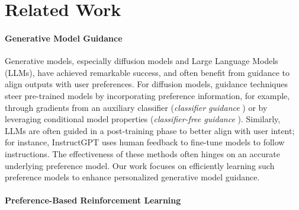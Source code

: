 \documentclass{article}
\begin{document}
\vspace{-0.2cm}\section{Related Work}
\vspace{-0.1cm}  \paragraph{Generative Model Guidance}
Generative models, especially diffusion models \cite{DBLP:journals/corr/abs-2006-11239, pmlr-v37-sohl-dickstein15, DBLP:journals/corr/abs-2105-05233} and Large Language Models (LLMs), have achieved remarkable success, and often benefit from guidance to align outputs with user preferences. For diffusion models, guidance techniques steer pre-trained models by incorporating preference information, for example, through gradients from an auxiliary classifier (\textit{classifier guidance} \cite{DBLP:journals/corr/abs-2105-05233, DBLP:journals/corr/abs-2011-13456}) or by leveraging conditional model properties (\textit{classifier-free guidance} \cite{ho2022classifierfreediffusionguidance}). Similarly, LLMs are often guided in a post-training phase to better align with user intent; for instance, InstructGPT \cite{ouyang2022traininglanguagemodelsfollow} uses human feedback to fine-tune models to follow instructions. The effectiveness of these methods often hinges on an accurate underlying preference model. Our work focuses on efficiently learning such preference models to enhance personalized generative model guidance.
\vspace{-0.2cm}  \paragraph{Preference-Based Reinforcement Learning}
\end{document}
